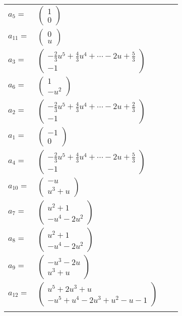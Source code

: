 \documentclass[1p]{elsarticle_modified}
\theoremstyle{definition}
\begin{document}
\begin{tabular}{m{7pt} m{180pt} m{7pt} m{180pt} }
\flushright $a_{5}=$&$\begin{pmatrix}1\\0\end{pmatrix}$ \\
\flushright $a_{11}=$&$\begin{pmatrix}0\\u\end{pmatrix}$ \\
\flushright $a_{3}=$&$\begin{pmatrix}-\frac{2}{3} u^5+\frac{4}{3} u^4+\cdots-2 u+\frac{5}{3}\\-1\end{pmatrix}$ \\
\flushright $a_{6}=$&$\begin{pmatrix}1\\- u^2\end{pmatrix}$ \\
\flushright $a_{2}=$&$\begin{pmatrix}-\frac{2}{3} u^5+\frac{4}{3} u^4+\cdots-2 u+\frac{2}{3}\\-1\end{pmatrix}$ \\
\flushright $a_{1}=$&$\begin{pmatrix}-1\\0\end{pmatrix}$ \\
\flushright $a_{4}=$&$\begin{pmatrix}-\frac{2}{3} u^5+\frac{4}{3} u^4+\cdots-2 u+\frac{5}{3}\\-1\end{pmatrix}$ \\
\flushright $a_{10}=$&$\begin{pmatrix}- u\\u^3+u\end{pmatrix}$ \\
\flushright $a_{7}=$&$\begin{pmatrix}u^2+1\\- u^4-2 u^2\end{pmatrix}$ \\
\flushright $a_{8}=$&$\begin{pmatrix}u^2+1\\- u^4-2 u^2\end{pmatrix}$ \\
\flushright $a_{9}=$&$\begin{pmatrix}- u^3-2 u\\u^3+u\end{pmatrix}$ \\
\flushright $a_{12}=$&$\begin{pmatrix}u^5+2 u^3+u\\- u^5+u^4-2 u^3+u^2- u-1\end{pmatrix}$\\&\end{tabular}
\end{document}
